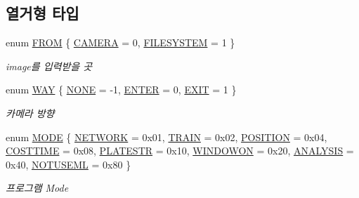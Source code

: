 \subsection*{열거형 타입}
\begin{DoxyCompactItemize}
\item 
enum \hyperlink{namespaceprocess_ac4191f2d90b44ca6a832f36481b403e7}{F\+R\+OM} \{ \hyperlink{namespaceprocess_ac4191f2d90b44ca6a832f36481b403e7a94d429f5a87a63afc443f022bdea773f}{C\+A\+M\+E\+RA} = 0, 
\hyperlink{namespaceprocess_ac4191f2d90b44ca6a832f36481b403e7a4f69e1b61f6a4a73e1473fe711b32837}{F\+I\+L\+E\+S\+Y\+S\+T\+EM} = 1
 \}\begin{DoxyCompactList}\small\item\em image를 입력받을 곳 \end{DoxyCompactList}
\item 
enum \hyperlink{namespaceprocess_aa30669026e4cf69a2550aace23bef68e}{W\+AY} \{ \hyperlink{namespaceprocess_aa30669026e4cf69a2550aace23bef68ea7cc3bc56e3206127aefb779215c3e5f2}{N\+O\+NE} = -\/1, 
\hyperlink{namespaceprocess_aa30669026e4cf69a2550aace23bef68eab1e12dcacd0520703b0da01c19534b34}{E\+N\+T\+ER} = 0, 
\hyperlink{namespaceprocess_aa30669026e4cf69a2550aace23bef68ea3eb2090cfcc0c0999e82591472385128}{E\+X\+IT} = 1
 \}\begin{DoxyCompactList}\small\item\em 카메라 방향 \end{DoxyCompactList}
\item 
enum \hyperlink{namespaceprocess_a38b4d487dfb47b712f32bfa52fa94464}{M\+O\+DE} \{ \newline
\hyperlink{namespaceprocess_a38b4d487dfb47b712f32bfa52fa94464ade7887da7de946a4708baa66f437ce44}{N\+E\+T\+W\+O\+RK} = 0x01, 
\hyperlink{namespaceprocess_a38b4d487dfb47b712f32bfa52fa94464a1997642964991dcd5ee63cd28185ef86}{T\+R\+A\+IN} = 0x02, 
\hyperlink{namespaceprocess_a38b4d487dfb47b712f32bfa52fa94464af1a2ca0ae6e0d4685b3996a47e56c0a6}{P\+O\+S\+I\+T\+I\+ON} = 0x04, 
\hyperlink{namespaceprocess_a38b4d487dfb47b712f32bfa52fa94464ac9d1691ee0c966c08f6cefdd13a27b98}{C\+O\+S\+T\+T\+I\+ME} = 0x08, 
\newline
\hyperlink{namespaceprocess_a38b4d487dfb47b712f32bfa52fa94464a8c488cdfb82009e72ed939d49fbf788e}{P\+L\+A\+T\+E\+S\+TR} = 0x10, 
\hyperlink{namespaceprocess_a38b4d487dfb47b712f32bfa52fa94464a660edf2dffb7ba034fe83e1b28095833}{W\+I\+N\+D\+O\+W\+ON} = 0x20, 
\hyperlink{namespaceprocess_a38b4d487dfb47b712f32bfa52fa94464aa48cdb2d219079ab11a2967b01d7731a}{A\+N\+A\+L\+Y\+S\+IS} = 0x40, 
\hyperlink{namespaceprocess_a38b4d487dfb47b712f32bfa52fa94464a186cfc3bdf8fe842b027d5411b2d0da8}{N\+O\+T\+U\+S\+E\+ML} = 0x80
 \}\begin{DoxyCompactList}\small\item\em 프로그램 Mode \end{DoxyCompactList}
\end{DoxyCompactItemize}
